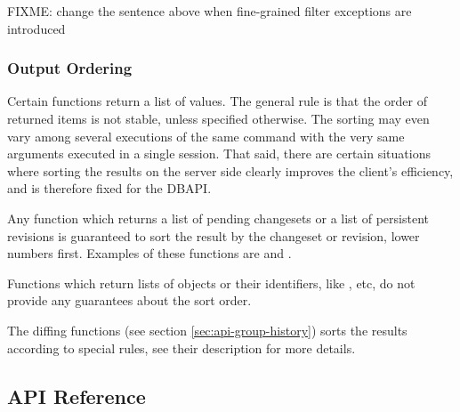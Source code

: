 \documentclass{article}
\begin{document}
FIXME: change the sentence above when fine-grained filter exceptions are introduced

\subsubsection{Output Ordering}

Certain functions return a list of values.  The general rule is that the order of returned items is not stable, unless
specified otherwise.  The sorting may even vary among several executions of the same command with the very same
arguments executed in a single session.  That said, there are certain situations where sorting the results on the server
side clearly improves the client's efficiency, and is therefore fixed for the DBAPI.

Any function which returns a list of pending changesets or a list of persistent revisions is guaranteed to sort the
result by the changeset or revision, lower numbers first.  Examples of these functions are 
and .

Functions which return lists of objects or their identifiers, like ,
 etc, do not provide any guarantees about the sort order.

The diffing functions (see section \ref{sec:api-group-history}) sorts the results according to special rules, see their
description for more details.

\subsection{API Reference}

\newcommand{\deskaFunc}[5]
{\paragraph{#1}\label{sec:api-ref-#1}

{#4}

{#5}

\subparagraph{Sample JSON input} {\tt \{"command": "{#1}"{#2}\}}

\subparagraph{Sample JSON output} {\tt \{"response": "{#1}"{#2}\ifstrequal{#3}{}{}{, "{#1}": {#3}}\}}

}

\newcommand{\deskaUnsortedRes}{The order of the returned data is not specified.}

\setcounter{secnumdepth}{4}
\end{document}

